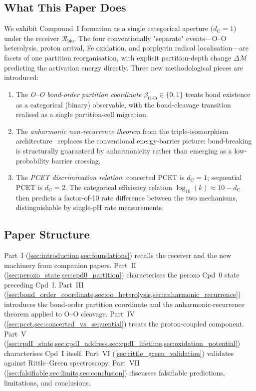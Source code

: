 \documentclass[11pt,twocolumn,a4paper]{article}
\theoremstyle{definition}
\theoremstyle{remark}
\newcommand{\Recv}{\mathcal{R}}
\newcommand{\depth}{\mathcal{M}}
\newcommand{\dC}{d_{\mathrm{C}}}
\newcommand{\bondorder}{\beta_{\mathrm{O\text{-}O}}}
\begin{document}
\subsection{What This Paper Does}

We exhibit Compound~I formation as a single categorical aperture
($\dC = 1$) under the receiver $\Recv_{\mathrm{bio}}$. The four conventionally
"separate" events---O--O heterolysis, proton arrival, Fe oxidation, and
porphyrin radical localisation---are facets of one partition reorganisation,
with explicit partition-depth change $\Delta\depth$ predicting the
activation energy directly. Three new methodological pieces are introduced:

\begin{enumerate}[leftmargin=*, nosep]
\item The \emph{O--O bond-order partition coordinate} $\bondorder \in \{0, 1\}$
  treats bond existence as a categorical (binary) observable, with the
  bond-cleavage transition realised as a single partition-cell migration.
\item The \emph{anharmonic non-recurrence theorem} from the triple-isomorphism
  architecture~\citep{sachikonye2025_isomorphism} replaces the conventional
  energy-barrier picture: bond-breaking is structurally guaranteed by
  anharmonicity rather than emerging as a low-probability barrier crossing.
\item The \emph{PCET discrimination relation}: concerted PCET is $\dC = 1$;
  sequential PCET is $\dC = 2$. The categorical efficiency relation
  $\log_{10}(k) \approx 10 - \dC$ then predicts a factor-of-10 rate
  difference between the two mechanisms, distinguishable by single-pH
  rate measurements.
\end{enumerate}

\subsection{Paper Structure}

Part~I (\cref{sec:introduction,sec:foundations}) recalls the receiver and
the new machinery from companion papers. Part~II (\cref{sec:peroxo_state,sec:cpd0_partition})
characterises the peroxo Cpd~0 state preceding Cpd~I. Part~III
(\cref{sec:bond_order_coordinate,sec:oo_heterolysis,sec:anharmonic_recurrence})
introduces the bond-order partition coordinate and the anharmonic-recurrence
theorem applied to O--O cleavage. Part~IV
(\cref{sec:pcet,sec:concerted_vs_sequential})
treats the proton-coupled component. Part~V
(\cref{sec:cpdI_state,sec:cpdI_address,sec:cpdI_lifetime,sec:oxidation_potential})
characterises Cpd~I itself. Part~VI (\cref{sec:rittle_green_validation})
validates against Rittle--Green spectroscopy. Part~VII
(\cref{sec:falsifiable,sec:limits,sec:conclusion}) discusses falsifiable
predictions, limitations, and conclusions.
\end{document}
